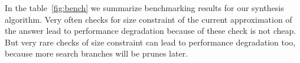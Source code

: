 In the table~\ref{fig:bench} we summarize benchmarking results for our synthesis algorithm.
Very often checks for size constraint of the current approximation of the answer lead to performance degradation
because of these check is not cheap. But very rare checks of size constraint can lead to performance degradation too,
because more search branches will be prunes later.
